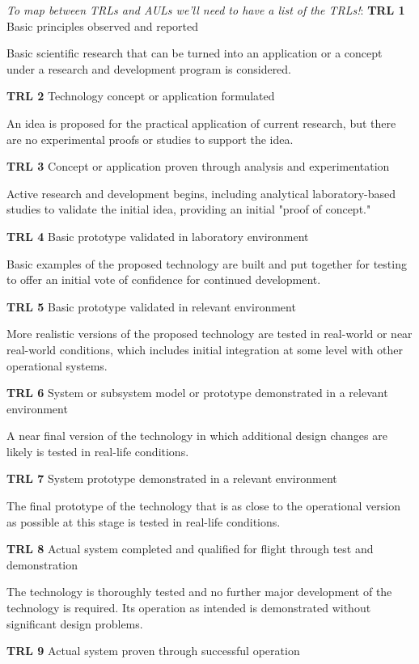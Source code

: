 \documentclass[referee,a4paper,12pt,traditabstract]{swsc}
\begin{document}
\begin{linenumbers}
\textit{To map between TRLs and AULs we'll need to have a list of the TRLs!}:
\textbf{TRL 1}
Basic principles observed and reported

Basic scientific research that can be turned into an application or a concept under a research and development program is considered.

\textbf{TRL 2}
Technology concept or application formulated

An idea is proposed for the practical application of current research, but there are no experimental proofs or studies to support the idea.

\textbf{TRL 3}
Concept or application proven through analysis and experimentation

Active research and development begins, including analytical laboratory-based studies to validate the initial idea, providing an initial "proof of concept."

\textbf{TRL 4}
Basic prototype validated in laboratory environment

Basic examples of the proposed technology are built and put together for testing to offer an initial vote of confidence for continued development.

\textbf{TRL 5}
Basic prototype validated in relevant environment

More realistic versions of the proposed technology are tested in real-world or near real-world conditions, which includes initial integration at some level with other operational systems.

\textbf{TRL 6}
System or subsystem model or prototype demonstrated in a relevant environment

A near final version of the technology in which additional design changes are likely is tested in real-life conditions.

\textbf{TRL 7}
System prototype demonstrated in a relevant environment

The final prototype of the technology that is as close to the operational version as possible at this stage is tested in real-life conditions.

\textbf{TRL 8}
Actual system completed and qualified for flight through test and demonstration

The technology is thoroughly tested and no further major development of the technology is required. Its operation as intended is demonstrated without significant design problems.

\textbf{TRL 9}
Actual system proven through successful operation


\end{linenumbers}
\end{document}

